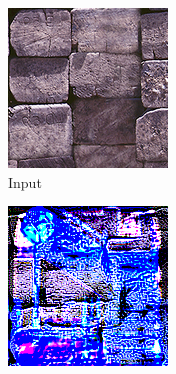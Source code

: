 \begin{figure}[]
\begin{subfigure}{\textwidth}
        \begin{subfigure}{0.19\textwidth}
            \centering
            \includegraphics[width=\textwidth]{images/04-experiment03/staircase_beams_target.jpg}
            \caption*{Input}
        \end{subfigure}
        \hfill
        \begin{subfigure}{0.19\textwidth}
            \centering
            \includegraphics[width=\textwidth]{images/04-experiment03/staircase_illum/beams/stats_im.jpg}

\end{subfigure}
\end{subfigure}
\end{figure}
